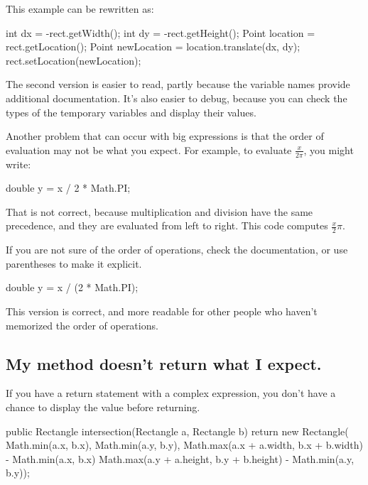 \documentclass[12pt]{book}
\theoremstyle{exercise}
\begin{document}
This example can be rewritten as:

\begin{code}
    int dx = -rect.getWidth();
    int dy = -rect.getHeight();
    Point location = rect.getLocation();
    Point newLocation = location.translate(dx, dy);
    rect.setLocation(newLocation);
\end{code}

The second version is easier to read, partly because the variable names provide additional documentation.
It's also easier to debug, because you can check the types of the temporary variables and display their values.


Another problem that can occur with big expressions is that the order of evaluation may not be what you expect.
For example, to evaluate $\frac{x}{2 \pi}$, you might write:

\begin{code}
    double y = x / 2 * Math.PI;
\end{code}

That is not correct, because multiplication and division have the same precedence, and they are evaluated from left to right.
This code computes $\frac{x}{2}\pi$.

If you are not sure of the order of operations, check the documentation, or use parentheses to make it explicit.

\begin{code}
    double y = x / (2 * Math.PI);
\end{code}

This version is correct, and more readable for other people who haven't memorized the order of operations.


\subsection*{My method doesn't return what I expect.}


If you have a return statement with a complex expression, you don't have a chance to display the value before returning.

\begin{code}
    public Rectangle intersection(Rectangle a, Rectangle b) {
        return new Rectangle(
            Math.min(a.x, b.x), Math.min(a.y, b.y),
            Math.max(a.x + a.width, b.x + b.width)
                - Math.min(a.x, b.x)
            Math.max(a.y + a.height, b.y + b.height)
                - Math.min(a.y, b.y));
    }
\end{code}
\end{document}
